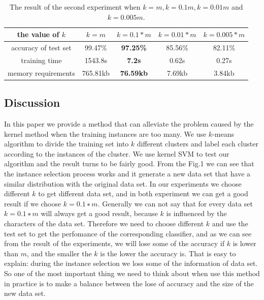 \documentclass[runningheads,a4paper]{llncs}
\begin{document}
\begin{table}[tbp]
\centering  
\begin{tabular}{c|c|c|c|c}
\hline
		the value of $k$ &$k=m$ &$k=0.1*m$ &$k=0.01*m$ &$k=0.005*m$\\ 
\hline  
		accuracy of test set &99.47\% &\textbf{97.25\%} &85.56\% &82.11\%\\    
		 
		training time & 1543.8s &\textbf{7.2s} &0.62s & 0.27s \\
		
		memory requirements & 765.81kb & \textbf{76.59kb} & 7.69kb & 3.84kb \\    
\hline
\end{tabular}
\caption{The result of the second experiment when $k=m, k=0.1m, k=0.01m$ and $k=0.005m$.}
\end{table}


\subsection{Discussion}
		In this paper we provide a method that can alleviate the problem caused by the kernel method when 
		the training instances are too many. We use $k$-means algorithm to divide the training set into $k$ 
		different clusters and label each cluster according to the instances of the cluster. We use kernel 
		SVM to test our algorithm and the result turns to be fairly good. From the Fig.1 we can 
		see that the instance selection process works and it generate a new data set that have a similar 
		distribution with the original data set. In our experiments we 
		choose different $k$ to get different data set, and in both experiment we can get a good result if 
		we choose $k = 0.1 ∗ m$. Generally we can not say that for every data set $k = 0.1 ∗ m$ will 
		always get a good result, because $k$ is influenced by the characters of 
		the data set. Therefore we need to choose different $k$ and use the test set to get the perfomance
		of the corresponding classifier, and as we can 
		see from the result of the experiments, we will lose some of the accuracy if $k$ is lower than $m$, 
		and the smaller the $k$ is the lower the accuracy is. That is easy to explain: during the instance 
		selection we loss some of the information of data set. So one of the most important thing we need to 
		think about when use this method in practice is to make a balance between the lose of accuracy and 
		the size of the new data set.
		
\end{document}
